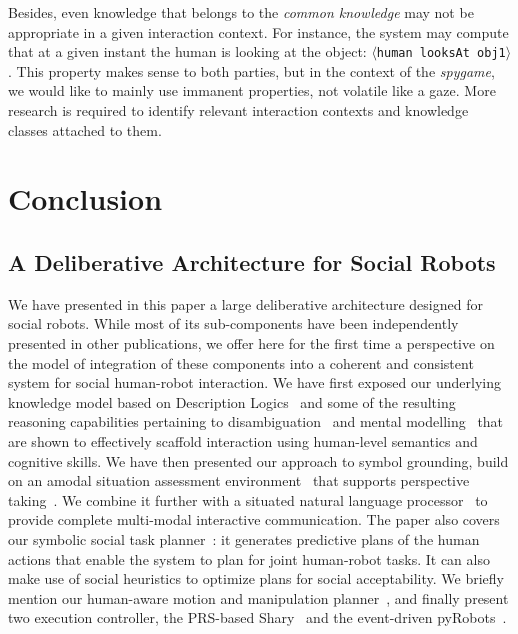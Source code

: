 \documentclass[preprint,3p,times]{elsarticle}
\newcommand{\stmt}[1]{{\footnotesize\tt$\langle$#1\relax$\rangle$}}
\begin{document}
Besides, even knowledge that belongs to the \emph{common knowledge} may not be
appropriate in a given interaction context. For instance, the system may
compute that at a given instant the human is looking at the object: \stmt{human
looksAt obj1}. This property makes sense to both parties, but in the context of
the \emph{spygame}, we would like to mainly use immanent properties, not
volatile like a gaze. More research is required to identify relevant
interaction contexts and knowledge classes attached to them.

\section{Conclusion}
\label{sect|conclusion}

\subsection{A Deliberative Architecture for Social Robots}

We have presented in this paper a large deliberative architecture designed for
social robots. While most of its sub-components have been independently
presented in other publications, we offer here for the first time a perspective
on the model of integration of these components into a coherent and consistent
system for social human-robot interaction. We have first exposed our underlying
knowledge model based on Description Logics~\cite{Lemaignan2010} and some of the
resulting reasoning capabilities pertaining to disambiguation~\cite{Ros2010b}
and mental modelling~\cite{warnier2012when} that are shown to effectively
scaffold interaction using human-level semantics and cognitive skills. We have
then presented our approach to symbol grounding, build on an amodal situation
assessment environment~\cite{Sisbot2011} that supports perspective
taking~\cite{Marin2008,Ros2010}. We combine it further with a situated natural
language processor~\cite{Lemaignan2011a} to provide complete multi-modal
interactive communication.  The paper also covers our symbolic social task
planner~\cite{Alili2008, Alili2009, Lallement2014}: it generates predictive
plans of the human actions that enable the system to plan for joint human-robot
tasks. It can also make use of social heuristics to optimize plans for social
acceptability. We briefly mention our human-aware motion and manipulation
planner~\cite{Sisbot2008,Mainprice2011,Pandey2011}, and finally present two
execution controller, the PRS-based {\sc Shary}~\cite{clodic2008shary,fiore2014}
and the event-driven {\sc pyRobots}~\cite{lemaignan2015pyrobots}.
\end{document}
